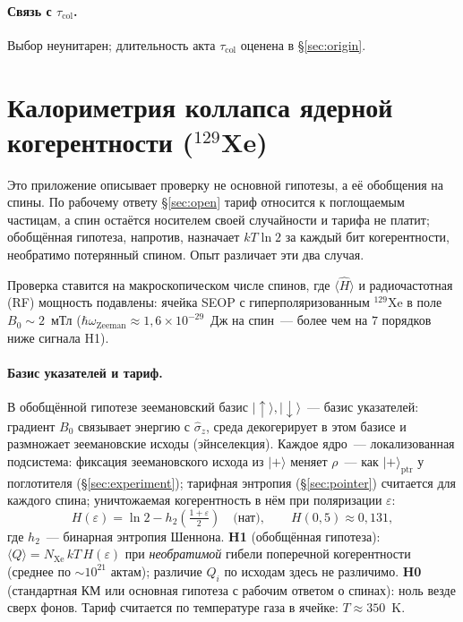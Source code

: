 \documentclass[11pt,a4paper]{article}
\newcommand{\Sref}[1]{\hyperref[#1]{\S\ref{#1}}}
\begin{document}
\paragraph{Связь с $\tau_{\mathrm{col}}$.}
Выбор неунитарен; длительность акта $\tau_{\mathrm{col}}$ оценена в \Sref{sec:origin}.

\section{Калориметрия коллапса ядерной когерентности ($^{129}$Xe)}\label{app:xe}

Это приложение описывает проверку не основной гипотезы, а её обобщения на спины. По рабочему ответу \Sref{sec:open} тариф относится к поглощаемым частицам, а спин остаётся носителем своей случайности и тарифа не платит; обобщённая гипотеза, напротив, назначает $kT\ln 2$ за каждый бит когерентности, необратимо потерянный спином. Опыт различает эти два случая.

Проверка ставится на макроскопическом числе спинов, где $\langle\hat{H}\rangle$ и радиочастотная (RF) мощность подавлены: ячейка SEOP с гиперполяризованным $^{129}$Xe в поле $B_0 \sim 2$~мТл ($\hbar\omega_{\mathrm{Zeeman}} \approx 1{,}6\times 10^{-29}$~Дж на спин~--- более чем на $7$ порядков ниже сигнала H1).

\paragraph{Базис указателей и тариф.}
В обобщённой гипотезе зеемановский базис $|{\uparrow}\rangle,|{\downarrow}\rangle$~--- базис указателей: градиент $B_0$ связывает энергию с $\hat\sigma_z$, среда декогерирует в этом базисе и размножает зеемановские исходы (эйнселекция). Каждое ядро~--- локализованная подсистема: фиксация зеемановского исхода из $|{+}\rangle$ меняет $\rho$~--- как $|{+}\rangle_{\mathrm{ptr}}$ у поглотителя (\Sref{sec:experiment}); тарифная энтропия (\Sref{sec:pointer}) считается для каждого спина; уничтожаемая когерентность в нём при поляризации $\varepsilon$:
\begin{equation}
H(\varepsilon) = \ln 2 - h_2\!\left(\tfrac{1+\varepsilon}{2}\right) \quad \text{(нат)}, \qquad H(0{,}5) \approx 0{,}131,
\end{equation}
где $h_2$~--- бинарная энтропия Шеннона. \textbf{H1} (обобщённая гипотеза): $\langle Q\rangle = N_{\mathrm{Xe}}\, k T\, H(\varepsilon)$ при \emph{необратимой} гибели поперечной когерентности (среднее по $\sim 10^{21}$ актам); различие $Q_i$ по исходам здесь не различимо. \textbf{H0} (стандартная КМ или основная гипотеза с рабочим ответом о спинах): ноль везде сверх фонов. Тариф считается по температуре газа в ячейке: $T \approx 350$~K.
\end{document}
